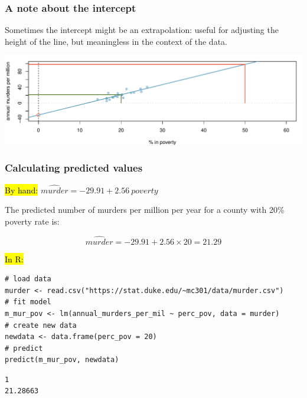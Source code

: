 \documentclass[slidestop,compress,mathserif,12pt,t,professionalfonts,xcolor=table]{beamer}
\begin{document}
\begin{frame}
\frametitle{A note about the intercept}

Sometimes the intercept might be an extrapolation: useful for adjusting the height of the line, but meaningless in the context of the data.

\begin{center}
\includegraphics[width=\textwidth]{figures/murder/annual_murders_per_mil_perc_pov_wide}
\end{center}

\end{frame}


\begin{frame}[fragile]
\frametitle{Calculating predicted values}

\hl{By hand:} $\widehat{murder} = -29.91 + 2.56~poverty$

The predicted number of murders per million per year for a county with 20\% poverty rate is: 

\pause

\[ \widehat{murder} = -29.91 + 2.56 \times 20 = 21.29 \]

\vfill

\pause

\hl{In R:}

{\scriptsize
\begin{Verbatim}[frame=single, formatcom=\color{blue}]
# load data
murder <- read.csv("https://stat.duke.edu/~mc301/data/murder.csv")
# fit model
m_mur_pov <- lm(annual_murders_per_mil ~ perc_pov, data = murder)
# create new data
newdata <- data.frame(perc_pov = 20)
# predict
predict(m_mur_pov, newdata)
\end{Verbatim}
}

\pause

{\scriptsize
\begin{Verbatim}[frame=single, formatcom=\color{gray}]
       1 
21.28663 
\end{Verbatim}
}

\end{frame}
\end{document}
